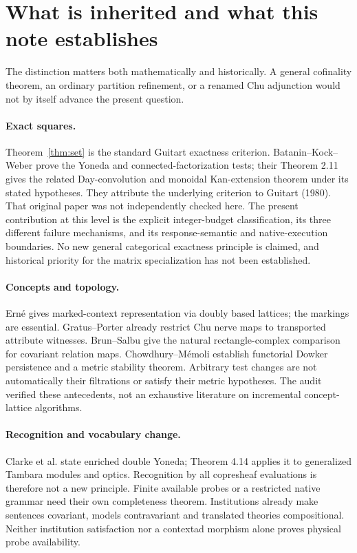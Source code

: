 \documentclass[11pt]{article}
\theoremstyle{definition}\newtheorem{definition}[theorem]{Definition}
\theoremstyle{remark}\newtheorem{remark}[theorem]{Remark}
\begin{document}
\section{What is inherited and what this note establishes}\label{sec:prior}
The distinction matters both mathematically and historically. A general
cofinality theorem, an ordinary partition refinement, or a renamed Chu
adjunction would not by itself advance the present question.

\paragraph{Exact squares.}
Theorem~\ref{thm:set} is the standard Guitart exactness criterion.
Batanin--Kock--Weber \cite[Lemmas 2.2 and 2.4]{BKW} prove the Yoneda
and connected-factorization tests; their Theorem 2.11 gives the related
Day-convolution and monoidal Kan-extension theorem under its stated
hypotheses. They attribute the underlying criterion to Guitart (1980).
That original paper was not independently checked here. The present
contribution at this level is the explicit integer-budget classification,
its three different failure mechanisms, and its response-semantic and
native-execution boundaries. No new general categorical exactness principle
is claimed, and historical priority for the matrix specialization has not
been established.

\paragraph{Concepts and topology.}
Ern\'e \cite[Theorem 7.1]{Erne} gives marked-context representation via
doubly based lattices; the markings are essential. Gratus--Porter
\cite[Proposition 1(ii), Corollary 1]{GP} already restrict Chu nerve maps
to transported attribute witnesses. Brun--Salbu \cite[Definition 3.2,
Theorem 4.3]{BS} give the natural rectangle-complex comparison for
covariant relation maps. Chowdhury--M\'emoli \cite[Theorem 3,
Corollary 20, Proposition 15]{DowkerPersistence} establish functorial
Dowker persistence and a metric stability theorem. Arbitrary test changes
are not automatically their filtrations or satisfy their metric hypotheses.
The audit verified these antecedents, not an exhaustive literature on
incremental concept-lattice algorithms.

\paragraph{Recognition and vocabulary change.}
Clarke et al. \cite[Lemma 4.12]{Optics} state enriched double Yoneda;
Theorem 4.14 applies it to generalized Tambara modules and optics.
Recognition by all copresheaf evaluations is therefore not a new principle.
Finite available probes or a restricted native grammar need their own
completeness theorem. Institutions \cite[Definition 1, Theorem 11]{Institutions}
already make sentences covariant, models contravariant and translated
theories compositional. Neither institution satisfaction nor a contextad
morphism alone proves physical probe availability.
\end{document}
